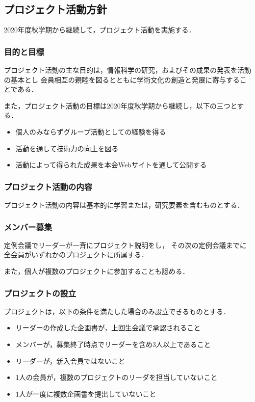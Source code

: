 \subsection*{プロジェクト活動方針}


2020年度秋学期から継続して，プロジェクト活動を実施する．

\subsubsection*{目的と目標}
プロジェクト活動の主な目的は，情報科学の研究，およびその成果の発表を活動の基本とし
会員相互の親睦を図るとともに学術文化の創造と発展に寄与することである．

また，プロジェクト活動の目標は2020年度秋学期から継続し，以下の三つとする．

\begin{itemize}
\item 個人のみならずグループ活動としての経験を得る
\item 活動を通して技術力の向上を図る
\item 活動によって得られた成果を本会Webサイトを通して公開する
\end{itemize}

\subsubsection*{プロジェクト活動の内容}
プロジェクト活動の内容は基本的に学習または，研究要素を含むものとする．

\subsubsection*{メンバー募集}
定例会議でリーダーが一斉にプロジェクト説明をし，
その次の定例会議までに全会員がいずれかのプロジェクトに所属する．

また，個人が複数のプロジェクトに参加することも認める．

\subsubsection*{プロジェクトの設立}
プロジェクトは，以下の条件を満たした場合のみ設立できるものとする．

\begin{itemize}
\item リーダーの作成した企画書が，上回生会議で承認されること
\item メンバーが，募集終了時点でリーダーを含め3人以上であること
\item リーダーが，新入会員ではないこと
\item 1人の会員が，複数のプロジェクトのリーダを担当していないこと
\item 1人が一度に複数企画書を提出していないこと
\end{itemize}

